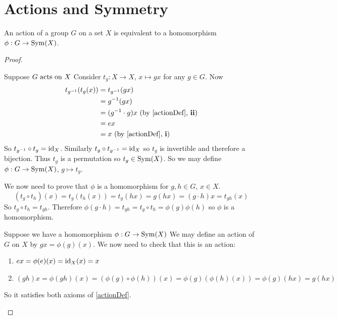 \documentclass[../main.tex]{subfiles}
\begin{document}
\section{Actions and Symmetry}
\begin{theorem}
  An action of a group $G$ on a set $X$ is equivalent to a homomorphism $\phi : G \to \operatorname{Sym}(X)$. \label{actionHomTheorem}
\end{theorem}
\begin{proof}
  \begin{proofdirection}{Suppose $G \text{ acts on } X$}
    Consider $t_g : X \to X$, $x \mapsto gx$ for any $g \in G$.
    Now
    \begin{align*}
      t_{g^{-1}}(t_g(x)) &= t_{g^{-1}}(gx) \\
                         &= g^{-1}(gx) \\
                         &= (g^{-1} \cdot g)x \text{ (by \cref{actionDef}, \textbf{ii})}\\
                         &= ex \\
                         &= x \text{ (by \cref{actionDef}, \textbf{i})}
    \end{align*}
    So $t_{g^{-1}} \circ t_g  = \mathrm{id}_X$.
    Similarly $t_g \circ t_{g^{-1}} = \mathrm{id}_X$ so $t_g$ is invertible and therefore a bijection.
    Thus $t_g$ is a permutation so $t_g \in \operatorname{Sym}(X)$.
    So we may define $\phi: G \to \operatorname{Sym}(X)$, $g \mapsto t_g$.

    We now need to prove that $\phi$ is a homomorphism for $g, h \in G$, $x \in X$.
    \[
      (t_g \circ t_h)(x) = t_g(t_h(x)) = t_g(hx) = g(hx) = (g \cdot h)x = t_{gh}(x)
    \]
    So $t_g \circ t_h = t_{gh}$.
    Therefore $\phi(g \cdot h) = t_{gh} = t_g \circ t_h = \phi(g)\phi(h)$ so $\phi$ is a homomorphism.
  \end{proofdirection}
  \begin{proofdirection}{Suppose we have a homomorphism $\phi: G \to \operatorname{Sym}(X)$}
    We may define an action of $G$ on $X$ by $gx = \phi(g)(x)$.
    We now need to check that this is an action:
    \begin{enumerate}
      \item $ex = \phi(e)(x) = \mathrm{id}_X(x) = x$
      \item $(gh)x = \phi(gh)(x) = (\phi(g) \circ \phi(h))(x) = \phi(g)(\phi(h)(x)) = \phi(g)(hx) = g(hx)$
    \end{enumerate}
    So it satisfies both axioms of \cref{actionDef}.
  \end{proofdirection}
\end{proof}
\end{document}

